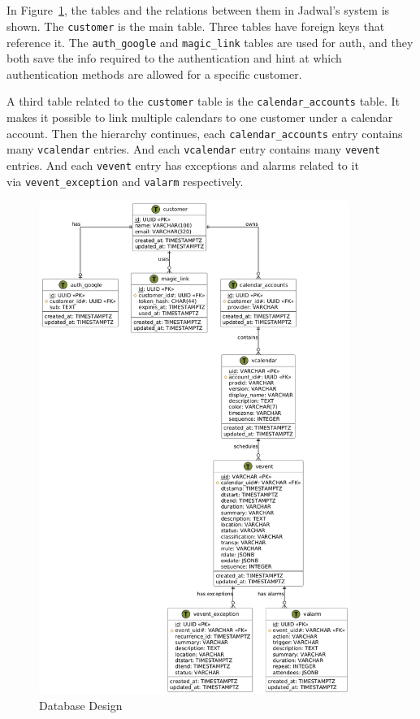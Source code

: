 \documentclass[12pt,a4paper]{report}
\begin{document}
\subsection{}

In Figure~\ref{fig:database-design}, the tables and the relations between them in Jadwal's system is shown. The \texttt{customer} is the main table. Three tables have foreign keys that reference it. The \texttt{auth\_google} and \texttt{magic\_link} tables are used for auth, and they both save the info required to the authentication and hint at which authentication methods are allowed for a specific customer.

A third table related to the \texttt{customer} table is the \texttt{calendar\_accounts} table. It makes it possible to link multiple calendars to one customer under a calendar account. Then the hierarchy continues, each \texttt{calendar\_accounts} entry contains many \texttt{vcalendar} entries. And each \texttt{vcalendar} entry contains many \texttt{vevent} entries. And each \texttt{vevent} entry has exceptions and alarms related to it\\via \texttt{vevent\_exception} and \texttt{valarm} respectively.

\begin{figure}[!h]
    \centering
    \includegraphics[width=0.9\textwidth]{images/docs/diagrams/er/database/Database Design.png}
    \caption{Database Design}
    \label{fig:database-design}
\end{figure}
\end{document}

